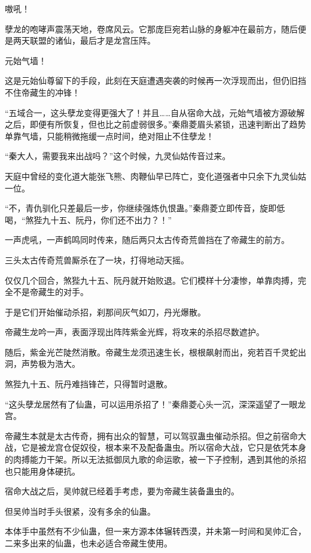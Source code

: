 
\begin{this_body}



嗷吼！

孽龙的咆哮声震荡天地，卷席风云。它那庞巨宛若山脉的身躯冲在最前方，随后便是两天联盟的诸仙，最后才是龙宫压阵。

元始气墙！

这是元始仙尊留下的手段，此刻在天庭遭遇突袭的时候再一次浮现而出，但仍旧挡不住帝藏生的冲锋！

“五域合一，这头孽龙变得更强大了！并且……自从宿命大战，元始气墙被方源破解之后，即便有所恢复，但也比之前虚弱很多。”秦鼎菱眉头紧锁，迅速判断出了趋势单靠气墙，只能稍微拖缓一点时间，绝对阻止不住孽龙！

“秦大人，需要我来出战吗？”这个时候，九灵仙姑传音过来。

天庭中曾经的变化道大能张飞熊、肉鞭仙早已阵亡，变化道强者中只余下九灵仙姑一位。

“不，青仇驯化只差最后一步，你继续强炼仇恨蛊。”秦鼎菱立即传音，旋即低喝，“煞狴九十五、阮丹，你们还不出力？！”

一声虎吼，一声鹤鸣同时传来，随后两只太古传奇荒兽挡在了帝藏生的前方。

三头太古传奇荒兽厮杀在了一块，打得地动天摇。

仅仅几个回合，煞狴九十五、阮丹就开始败退。它们模样十分凄惨，单靠肉搏，完全不是帝藏生的对手。

于是它们开始催动杀招，刹那间灰气如刀，丹光爆散。

帝藏生龙吟一声，表面浮现出阵阵紫金光辉，将攻来的杀招尽数遮护。

随后，紫金光芒陡然消散。帝藏生龙须迅速生长，根根飙射而出，宛若百千灵蛇出洞，声势极为浩大。

煞狴九十五、阮丹难挡锋芒，只得暂时退散。

“这头孽龙居然有了仙蛊，可以运用杀招了！”秦鼎菱心头一沉，深深遥望了一眼龙宫。

帝藏生本就是太古传奇，拥有出众的智慧，可以驾驭蛊虫催动杀招。但之前宿命大战，它是被龙宫仓促奴役，根本来不及配备蛊虫。所以宿命大战，它只是依凭本身的肉搏能力干架。所以无法抵御凤九歌的命运歌，被一下子控制，遇到其他的杀招也只能用身体硬抗。

宿命大战之后，吴帅就已经着手考虑，要为帝藏生装备蛊虫的。

但吴帅当时手头很紧，没有多余的仙蛊。

本体手中虽然有不少仙蛊，但一来方源本体辗转西漠，并未第一时间和吴帅汇合，二来多出来的仙蛊，也未必适合帝藏生使用。


\end{this_body}
